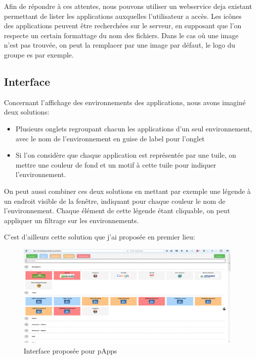 \documentclass[12pt]{report}
\begin{document}
    Afin de répondre à ces attentes, nous pouvons utiliser un webservice deja existant permettant de lister les applications auxquelles l'utilisateur a accès. Les icônes des applications peuvent être recherchées sur le serveur, en supposant que l'on respecte un certain formattage du nom des fichiers. Dans le cas où une image n'est pas trouvée, on peut la remplacer par une image par défaut, le logo du groupe \acrshort{es} par exemple.
    
    \newpage
    
    \subsection{Interface}
    Concernant l'affichage des environnements des applications, nous avons imaginé deux solutions:\vspace{-1em}
    \begin{itemize}
        \item Plusieurs onglets regroupant chacun les applications d'un seul environnement, avec le nom de l'environnement en guise de label pour l'onglet
        \item Si l'on considère que chaque application est représentée par une tuile, on mettre une couleur de fond et un motif à cette tuile pour indiquer l'environnement.
    \end{itemize}
    On peut aussi combiner ces deux solutions en mettant par exemple une légende à un endroit visible de la fenêtre, indiquant pour chaque couleur le nom de l'environnement. Chaque élément de cette légende étant cliquable, on peut appliquer un filtrage sur les environnements.
    
    C'est d'ailleurs cette solution que j'ai proposée en premier lieu:
    
    \begin{figure}[ht]
        \centering
        \includegraphics[width=0.99\textwidth]{img/interface_proposition_sfd.jpg}
        \caption{Interface proposée pour pApps}
        \label{fig:papps_interface}
    \end{figure}{}
    
\end{document}
